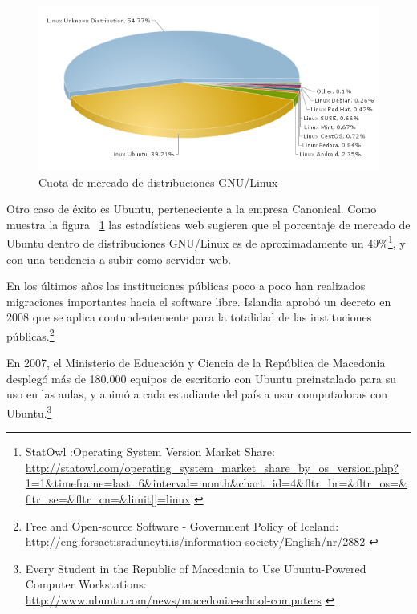 \begin{figure}[ht]
    \begin{center}
        \includegraphics[width=460px]{src/img/ubuntu-market-share.png}
        \caption[Tasa de mercado de
        distribuciones GNU/Linux] {Cuota de mercado de
        distribuciones GNU/Linux}
        \label{fig:ubuntumarketshare}
    \end{center}
\end{figure}

Otro caso de éxito es Ubuntu, perteneciente a la empresa Canonical. Como muestra
la figura ~\ref{fig:ubuntumarketshare} las estadísticas web sugieren que el
porcentaje de mercado de Ubuntu dentro de distribuciones GNU/Linux es de
aproximadamente un 49\%\footnote{StatOwl :Operating System Version Market Share:\\
\url{http://statowl.com/operating_system_market_share_by_os_version.php?1=1&timeframe=last_6&interval=month&chart_id=4&fltr_br=&fltr_os=&fltr_se=&fltr_cn=&limit[]=linux}
\label{ftn:ubuntumarketshare}}, y con una tendencia a subir como servidor
web. 

En los últimos años las instituciones públicas poco a poco han realizados
migraciones importantes hacia el software libre.
Islandia aprobó un decreto en 2008 que se aplica contundentemente para la
totalidad de las instituciones públicas.\footnote{Free and Open-source Software
- Government Policy of Iceland:\\
\url{http://eng.forsaetisraduneyti.is/information-society/English/nr/2882}
\label{ftn:ubuntuislandia}}

\newpage

En 2007, el Ministerio de Educación y Ciencia de la República de Macedonia
desplegó más de 180.000 equipos de escritorio con Ubuntu preinstalado para 
su uso en las aulas, y animó a cada estudiante del país a usar 
computadoras con Ubuntu.\footnote{Every Student in the Republic of Macedonia to Use Ubuntu-Powered Computer
Workstations:\\
\url{http://www.ubuntu.com/news/macedonia-school-computers}
\label{ftn:ubuntumacedonia}}

